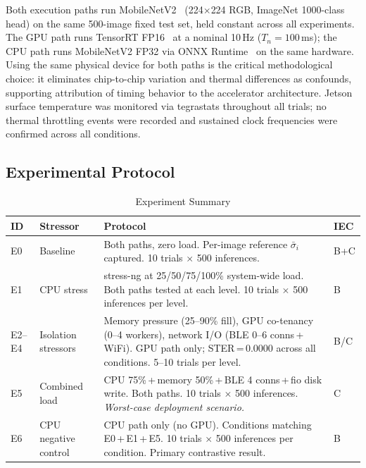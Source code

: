 \documentclass[journal,10pt,twocolumn]{IEEEtran}
\begin{document}
Both execution paths run MobileNetV2~\cite{sandler2018} (224$\times$224
RGB, ImageNet 1000-class head) on the same 500-image fixed test set,
held constant across all experiments.
The GPU path runs TensorRT FP16~\cite{tensorrt} at a nominal 10\,Hz
($T_n = 100$\,ms); the CPU path runs MobileNetV2 FP32 via ONNX
Runtime~\cite{onnxruntime} on the same hardware.
Using the same physical device for both paths is the critical
methodological choice: it eliminates chip-to-chip variation and thermal
differences as confounds, supporting attribution of timing behavior to
the accelerator architecture.
Jetson surface temperature was monitored via tegrastats throughout all
trials; no thermal throttling events were recorded and sustained clock
frequencies were confirmed across all conditions.

\subsection{Experimental Protocol}

\begin{table}[!t]
\caption{Experiment Summary}
\label{tab:experiments}
\centering
\small
\begin{tabular}{p{0.5cm}p{1.8cm}p{4.6cm}p{0.55cm}}
\toprule
\textbf{ID} & \textbf{Stressor} & \textbf{Protocol} & \textbf{IEC} \\
\midrule
E0 & Baseline & Both paths, zero load. Per-image reference $\bar{\sigma}_i$ captured. 10 trials $\times$ 500 inferences. & B+C \\
\addlinespace
E1 & CPU stress & stress-ng at 25/50/75/100\% system-wide load. Both paths tested at each level. 10 trials $\times$ 500 inferences per level. & B \\
\addlinespace
E2--E4 & Isolation stressors & Memory pressure (25--90\% fill), GPU co-tenancy (0--4 workers), network I/O (BLE 0--6 conns\,+\,WiFi). GPU path only; STER\,=\,0.0000 across all conditions. 5--10 trials per level. & B/C \\
\addlinespace
E5 & Combined load & CPU 75\%\,+\,memory 50\%\,+\,BLE 4 conns\,+\,fio disk write. Both paths. 10 trials $\times$ 500 inferences. \emph{Worst-case deployment scenario.} & C \\
\addlinespace
E6 & CPU negative control & CPU path only (no GPU). Conditions matching E0\,+\,E1\,+\,E5. 10 trials $\times$ 500 inferences per condition. Primary contrastive result. & B \\
\bottomrule
\end{tabular}
\end{table}
\end{document}
